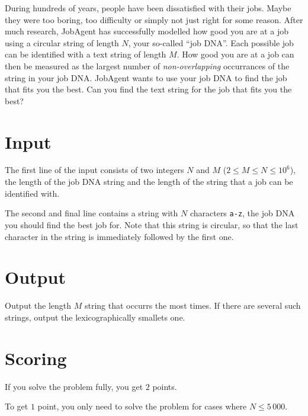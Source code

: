 During hundreds of years, people have been dissatisfied with their jobs.
Maybe they were too boring, too difficulty or simply not just right for some reason.
After much research, JobAgent has successfully modelled how good you are at a job using a circular string of length $N$, your so-called ``job DNA''.
Each possible job can be identified with a text string of length $M$.
How good you are at a job can then be measured as the largest number of \emph{non-overlapping} occurrances of the string in your job DNA.
JobAgent wants to use your job DNA to find the job that fits you the best.
Can you find the text string for the job that fits you the best?

\section*{Input}
The first line of the input consists of two integers $N$ and $M$ ($2 \le M \le N \le 10^6$), the length of the job DNA string and the length of the string that a job can be identified with.

The second and final line contains a string with $N$ characters \texttt{a-z}, the job DNA you should find the best job for.
Note that this string is circular, so that the last character in the string is immediately followed by the first one.

\section*{Output}
Output the length $M$ string that occurrs the most times.
If there are several such strings, output the lexicographically smallets one.

\section*{Scoring}
If you solve the problem fully, you get $2$ points.

To get $1$ point, you only need to solve the problem for cases where $N \le 5\,000$.
